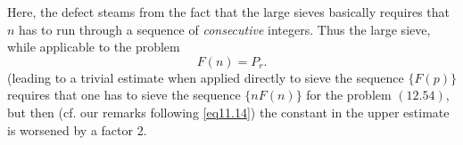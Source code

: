 Here, the defect steams from the fact that the large sieves basically
requires that $n$ has to run through a sequence of
\textit{consecutive} integers. Thus the large sieve, while applicable
to the problem 
\begin{equation*}
F(n)=P_r. \tag{12.55}\label{eq12.55}
\end{equation*} 
(leading to a trivial estimate when applied directly to sieve the
sequence $\{F(p)\}$ requires that one has to sieve the sequence $\{n
F(n)\}$ for the problem $(12.54)$, but then (cf. our remarks following
\eqref{eq11.14}) the constant in the upper estimate is worsened by a
factor 2. 
